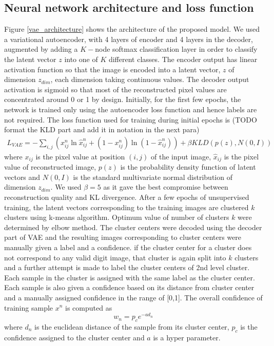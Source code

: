 \documentclass{uai2021} %
\begin{document}
\subsection{Neural network architecture and loss function}
Figure \ref{vae_architecture} shows the architecture of the proposed model.
We used a variational autoencoder\cite{kingma2013auto}, with 4 layers of encoder and 4 layers in the decoder, augmented by adding a $K-$node softmax classification layer in order to classify the latent vector $z$ into one of $K$ different classes.
The encoder output has linear activation function so that the image is encoded into a latent vector, $z$  of dimension $z_{dim}$, each dimension taking continuous values.
The decoder output activation is sigmoid so that most of the reconstructed pixel values  are concentrated around 0 or 1 by design.
Initially, for the first few epochs, the network is trained only using the autoencoder loss function and hence labels are not required.
The loss function used for training during initial epochs is (TODO format the KLD part and add it in notation in the next para)
\begin{multline}
L_{VAE} = -\sum_{i, j}(x_{ij}^n \ln \hat{x}_{ij}^n
+ (1 - x_{ij}^n) \ln(1 -  \hat{x}_{ij}^n ) )
    +\beta KLD(p(z), N(0,I))
\end{multline}
where   $x_{ij}$ is the pixel value at position $(i, j)$ of the input image, $\hat{x}_{ij}$ is the pixel value of reconstructed image, $p(z)$ is the probability density function of latent vectors and $N(0,I)$ is the standard multivariate normal distribution of dimension $z_{dim}$.
We used $\beta = 5$ as it gave the best compromise between reconstruction quality and KL divergence.
After a few epochs of unsupervised training, the latent vectors corresponding to the training images are clustered $k$ clusters using k-means algorithm.
Optimum value of number of clusters $k$ were determined by elbow method.
The cluster centers were decoded using the decoder part of VAE and the resulting images corresponding to cluster centers were manually given a label and a confidence.
if the cluster center for a cluster does not correspond to any valid digit image, that cluster is again split into $k$ clusters and a further attempt is made to label the cluster centers of 2nd level cluster.
Each sample in the cluster is assigned with the  same label as the cluster center.
Each sample is also given a confidence based on its distance from cluster center and  a manually assigned confidence in the range of [0,1].
The overall confidence of  training sample $x^n$ is computed as
\begin{equation}
w_n = p_ce^{-a d_n}
\end{equation}
where $d_n$ is the euclidean distance of the sample from its cluster center, $p_c$  is the confidence assigned to the cluster center and $a$ is a hyper parameter.
\end{document}
